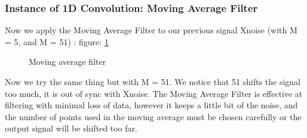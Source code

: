 \documentclass[a4paper,10pt]{article}
\begin{document}
	\subsubsection{Instance of 1D Convolution: Moving Average Filter}
	Now we apply the Moving Average Filter to our previous signal Xnoise (with M = 5, and M = 51) : figure: \ref{Moving average filter}
	\begin{figure}[!htb]\centering
	\begin{minipage}{0.45\textwidth}
	\end{minipage}
	\caption{Moving average filter}
	\label{Moving average filter}
	\end{figure}

	Now we try the same thing but with M = 51.
	We notice that 51 shifts the signal too much, it is out of sync with Xnoise.
	The Moving Average Filter is effective at filtering with minimal loss of data, however it keeps a little bit of the noise, and the number of points used in the moving average must be chosen carefully or the output signal will be shifted too far.	
\end{document}
